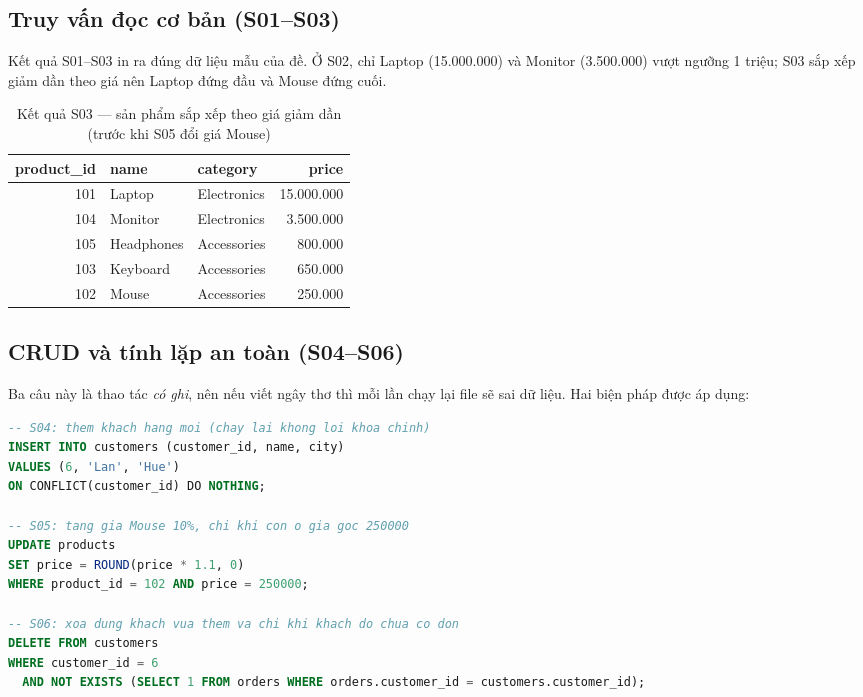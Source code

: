 \documentclass[12pt,a4paper]{article}
\begin{document}
\subsection{Truy vấn đọc cơ bản (S01--S03)}

Kết quả S01--S03 in ra đúng dữ liệu mẫu của đề. Ở S02, chỉ Laptop (15.000.000) và Monitor
(3.500.000) vượt ngưỡng 1 triệu; S03 sắp xếp giảm dần theo giá nên Laptop đứng đầu và Mouse đứng
cuối.

\begin{table}[H]
\centering
\caption{Kết quả S03 --- sản phẩm sắp xếp theo giá giảm dần (trước khi S05 đổi giá Mouse)}
\label{tab:s03}
\small
\begin{tabular}{@{}r l l r@{}}
\toprule
\textbf{product\_id} & \textbf{name} & \textbf{category} & \textbf{price} \\
\midrule
101 & Laptop     & Electronics & 15.000.000 \\
104 & Monitor    & Electronics &  3.500.000 \\
105 & Headphones & Accessories &    800.000 \\
103 & Keyboard   & Accessories &    650.000 \\
102 & Mouse      & Accessories &    250.000 \\
\bottomrule
\end{tabular}
\end{table}

\subsection{CRUD và tính lặp an toàn (S04--S06)}
\label{sec:s04s06}

Ba câu này là thao tác \emph{có ghi}, nên nếu viết ngây thơ thì mỗi lần chạy lại file sẽ sai dữ
liệu. Hai biện pháp được áp dụng:

\begin{lstlisting}[language=SQL,caption={S04--S06: thao tác ghi an toàn khi chạy lặp}]
-- S04: them khach hang moi (chay lai khong loi khoa chinh)
INSERT INTO customers (customer_id, name, city)
VALUES (6, 'Lan', 'Hue')
ON CONFLICT(customer_id) DO NOTHING;

-- S05: tang gia Mouse 10%, chi khi con o gia goc 250000
UPDATE products
SET price = ROUND(price * 1.1, 0)
WHERE product_id = 102 AND price = 250000;

-- S06: xoa dung khach vua them va chi khi khach do chua co don
DELETE FROM customers
WHERE customer_id = 6
  AND NOT EXISTS (SELECT 1 FROM orders WHERE orders.customer_id = customers.customer_id);
\end{lstlisting}
\end{document}
